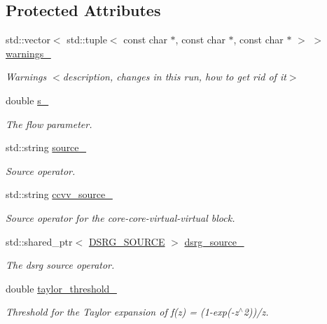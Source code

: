 \subsection*{Protected Attributes}
\begin{DoxyCompactItemize}
\item 
std\+::vector$<$ std\+::tuple$<$ const char $\ast$, const char $\ast$, const char $\ast$ $>$ $>$ \mbox{\hyperlink{classforte_1_1_s_a_d_s_r_g_ae8c39450caaed74164872767883e59bd}{warnings\+\_\+}}
\begin{DoxyCompactList}\small\item\em Warnings $<$description, changes in this run, how to get rid of it$>$ \end{DoxyCompactList}\item 
double \mbox{\hyperlink{classforte_1_1_s_a_d_s_r_g_af3e1221a9f04bf18e8a4f0c8b1fe50d1}{s\+\_\+}}
\begin{DoxyCompactList}\small\item\em The flow parameter. \end{DoxyCompactList}\item 
std\+::string \mbox{\hyperlink{classforte_1_1_s_a_d_s_r_g_a29ea7e43500e07b005ac38032127b537}{source\+\_\+}}
\begin{DoxyCompactList}\small\item\em Source operator. \end{DoxyCompactList}\item 
std\+::string \mbox{\hyperlink{classforte_1_1_s_a_d_s_r_g_a4b705f24d49349036463c8fba08bb87b}{ccvv\+\_\+source\+\_\+}}
\begin{DoxyCompactList}\small\item\em Source operator for the core-\/core-\/virtual-\/virtual block. \end{DoxyCompactList}\item 
std\+::shared\+\_\+ptr$<$ \mbox{\hyperlink{classforte_1_1_d_s_r_g___s_o_u_r_c_e}{D\+S\+R\+G\+\_\+\+S\+O\+U\+R\+CE}} $>$ \mbox{\hyperlink{classforte_1_1_s_a_d_s_r_g_a89c25c3b06bafd6a8b22a13089f86568}{dsrg\+\_\+source\+\_\+}}
\begin{DoxyCompactList}\small\item\em The dsrg source operator. \end{DoxyCompactList}\item 
double \mbox{\hyperlink{classforte_1_1_s_a_d_s_r_g_aff19c47a669973e2c67325030ff955f3}{taylor\+\_\+threshold\+\_\+}}
\begin{DoxyCompactList}\small\item\em Threshold for the Taylor expansion of f(z) = (1-\/exp(-\/z$^\wedge$2))/z. \end{DoxyCompactList}\item 

\end{DoxyCompactItemize}
